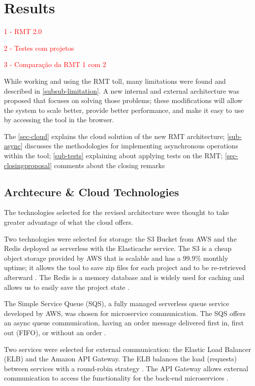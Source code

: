 \chapter{Results}
\label{results}
\textcolor{red}{
1 - RMT 2.0

2 - Testes com projetos

3 - Comparação da RMT 1 com 2
}

While working and using the RMT toll, many limitations were found and described in \cref{subsub-limitation}. A new internal and external architecture was proposed that focuses on solving those problems; these modifications will allow the system to scale better, provide better performance, and make it easy to use by accessing the tool in the browser.

The \cref{sec-cloud} explains the cloud solution of the new RMT architecture; \cref{sub-async} discusses the methodologies for implementing asynchronous operations within the tool; \cref{sub-tests} explaining about applying tests on the RMT; \cref{sec-closingproposal} comments about the closing remarks

\section{Archtecure \& Cloud Technologies}

The technologies selected for the revised architecture were thought to take greater advantage of what the cloud offers. 

Two technologies were selected for storage: the S3 Bucket from AWS and the Redis deployed as serverless with the Elasticache service. The S3 is a cheap object storage provided by AWS that is scalable and has a 99.9\% monthly uptime; it allows the tool to save zip files for each project and to be re-retrieved afterward \cite{S3}. The Redis is a memory database and is widely used for caching and allows us to easily save the project state \cite{Redis}.

The Simple Service Queue (SQS), a fully managed serverless queue service developed by AWS, was chosen for microservice communication. The SQS offers an async queue communication, having an order message delivered first in, first out (FIFO), or without an order \cite{sqs}.

Two services were selected for external communication: the Elastic Load Balancer (ELB) and the Amazon API Gateway. The ELB balances the load (requests) between services with a round-robin strategy \cite{Elb}. The API Gateway allows external communication to access the functionality for the back-end microservices \cite{Gateway}.

